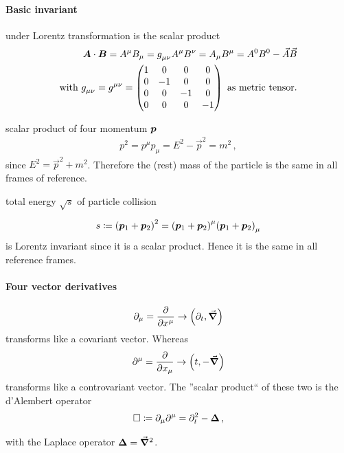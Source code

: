 \paragraph{Basic invariant} under Lorentz transformation is the scalar product
\begin{align}
    \fvec A \cdot \fvec B = A^\mu B_\mu = \tensor{g}{_\mu_\nu} A^\mu B^\nu = A_\mu B^\mu = A^0B^0 - \vec A \vec B\\
    \text{with } \tensor{g}{_\mu_\nu} = \tensor{g}{^\mu^\nu} = \mat{1 & 0 & 0 & 0 \\ 0 & -1 & 0 & 0 \\ 0 & 0 & -1 & 0 \\ 0 & 0 & 0 & -1} \text{ as metric tensor.} \nonumber
\end{align}
\begin{example}
    scalar product of four momentum ${\bm{p}}$
    \begin{align}
        p^2 = p^\mu p_\mu = E^2 - \vec p^2 = m^2\,,
    \end{align}
    since $E^2 = \vec p^2 +m^2$. Therefore the (rest) mass of the particle is the same in all frames of reference.
\end{example}
\begin{example}
    total energy $\sqrt s$ of particle collision
    \begin{center}
    \end{center}
    \begin{align}
        s \coloneqq \qty( {\bm{p}}_1 + {\bm{p}}_2)^2 = \qty( {\bm{p}}_1 + {\bm{p}}_2 )^\mu \qty( {\bm{p}}_1 + {\bm{p}}_2 )_\mu 
    \end{align}
    is Lorentz invariant since it is a scalar product. Hence it is the same in all reference frames.
\end{example}
\paragraph{Four vector derivatives}
\begin{align}
    \partial_\mu = \pdv{x^\mu} \rightarrow \qty( \partial_t, \vec \grad )
\end{align}
transforms like a covariant vector. Whereas
\begin{align}
    \partial^\mu = \pdv{x_\mu} \rightarrow \qty(t, - \vec \grad)
\end{align}
transforms like a controvariant vector. The ''scalar product`` of these two is the d'Alembert operator
\begin{align}
    \Box \coloneqq \partial_\mu\partial^\mu = \partial_t^2 - \bm{\Delta}\,,
\end{align}
\begin{compactitem}
    \item[with] the Laplace operator $\bm{\Delta} = \vec \grad^2$.
\end{compactitem}

